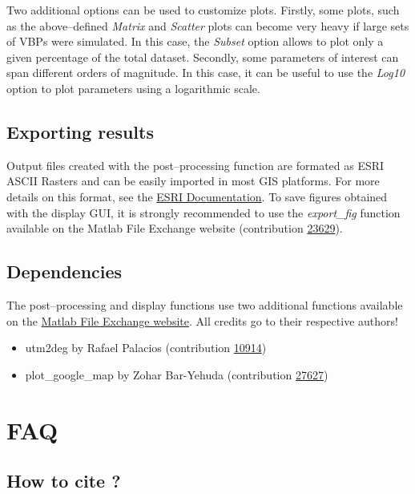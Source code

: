 \documentclass[10pt,a4paper]{article}
\begin{document}
Two additional options can be used to customize plots. Firstly, some plots, such as the above--defined \textit{Matrix} and \textit{Scatter} plots can become very heavy if large sets of VBPs were simulated. In this case, the \textit{Subset} option allows to plot only a given percentage of the total dataset. Secondly, some parameters of interest can span different orders of magnitude. In this case, it can be useful to use the \textit{Log10} option to plot parameters using a logarithmic scale.

\subsection{Exporting results}
Output files created with the post--processing function are formated as ESRI ASCII Rasters and can be easily imported in most GIS platforms. For more details on this format, see the \href{http://resources.esri.com/help/9.3/arcgisdesktop/com/gp_toolref/spatial_analyst_tools/esri_ascii_raster_format.htm}{ESRI Documentation}. To save figures obtained with the display GUI, it is strongly recommended to use the \textit{export\_fig} function available on the Matlab File Exchange website (contribution \href{http://mathworks.com/matlabcentral/fileexchange/23629-export-fig}{23629}).

\subsection{Dependencies}
The post--processing and display functions use two additional functions available on the \href{http://www.mathworks.com/matlabcentral/fileexchange/}{Matlab File Exchange website}. All credits go to their respective authors!
\begin{itemize}
\item \textsf{\color{namecolor}utm2deg} by Rafael Palacios (contribution \href{http://www.mathworks.com/matlabcentral/fileexchange/10914-utm2deg}{10914})
\item \textsf{\color{namecolor}plot\_google\_map} by Zohar Bar-Yehuda (contribution \href{http://www.mathworks.com/matlabcentral/fileexchange/27627-zoharby-plot-google-map}{27627})
\end{itemize}


\section{FAQ}
\label{sec-6}

\subsection{How to cite ?}
\label{sec-6-1}
\end{document}
